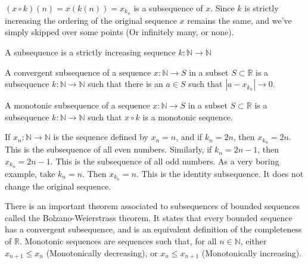 \documentclass[crop=false,class=book,oneside]{standalone}
\begin{document}
            $(x\circ{k})(n)=x(k(n))=x_{k_{n}}$ is a
            subsequence of $x$. Since $k$ is strictly
            increasing the ordering of the original sequence $x$
            remains the same, and we've simply skipped over
            some points (Or infinitely many, or none).
            \begin{definition}
                A subsequence is a strictly increasing sequence
                $k:\mathbb{N}\rightarrow\mathbb{N}$
            \end{definition}
            \begin{definition}
                A convergent subsequence of a sequence
                $x:\mathbb{N}\rightarrow{S}$ in
                a subset $S\subset\mathbb{R}$ is a
                subsequence $k:\mathbb{N}\rightarrow\mathbb{N}$
                such that there is an $a\in{S}$ such that
                $|a-x_{k_{n}}|\rightarrow{0}$.
            \end{definition}
            \begin{definition}
                A monotonic subsequence of a sequence
                $x:\mathbb{N}\rightarrow{S}$ in a subset
                $S\subset\mathbb{R}$ is a subsequence
                $k:\mathbb{N}\rightarrow\mathbb{N}$ such
                that $x\circ{k}$ is a monotonic sequence.
            \end{definition}
            \begin{example}
                If $x_{n}:\mathbb{N}\rightarrow\mathbb{N}$ is
                the sequence defined by $x_{n}=n$, and if
                $k_{n}=2n$, then $x_{k_{n}}=2n$. This is the
                subsequence of all even numbers. Similarly,
                if $k_{n}=2n-1$, then $x_{k_{n}}=2n-1$. This
                is the subsequence of all odd numbers. As a
                very boring example, take $k_{n}=n$. Then
                $x_{k_{n}}=n$. This is the identity subsequence.
                It does not change the original sequence.
            \end{example}
            There is an important theorem associated
            to subsequences of bounded sequences called the
            Bolzano-Weierstrass theorem. It states that
            every bounded sequence has a convergent subsequence,
            and is an equivalent definition of the
            completeness of $\mathbb{R}$.
            Monotonic sequences are sequences such
            that, for all $n\in\mathbb{N}$, either
            $x_{n+1}\leq{x_{n}}$ (Monotonically decreasing),
            or $x_{n}\leq{x_{n+1}}$ (Monotonically increasing).
\end{document}

